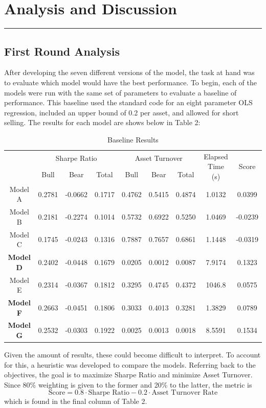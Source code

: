 \documentclass[10pt]{article}
\begin{document}
\section{Analysis and Discussion}
\label{sec:sec4}
\hrule \vspace{15pt}
\subsection{First Round Analysis}
After developing the seven different versions of the model, the task at hand was to evaluate which model would have the best performance. To begin, each of the models were run with the same set of parameters to evaluate a baseline of performance. This baseline used the standard code for an eight parameter OLS regression, included an upper bound of 0.2 per asset, and allowed for short selling. The results for each model are shows below in Table 2:\bigskip

\begin{table}[!htbp]
\footnotesize
\centering
\begin{tabular}{c | c c c | c c c | c | c } 
\hline 
\rule{0pt}{3ex}  \multirow{2}{*}{\textbf{Model}} & \multicolumn{3}{c|}{Sharpe Ratio} & \multicolumn{3}{c|}{Asset Turnover} &   \multirow{2}{*}{Elapsed Time (s)} & \multirow{2}{*}{Score}  \\[1ex]\cline{2-7} 
\rule{0pt}{3ex} &  Bull  &  Bear &  Total & Bull  &  Bear &  Total &  \\[1ex]
\hline 
\rule{0pt}{3ex}Model A        & 
0.2781 &  -0.0662 & 0.1717 & 0.4762 & 0.5415 & 0.4874 & 1.0132 & 0.0399 \\ [1ex]
Model B   & 0.2181    &-0.2274 &0.1014 &0.5732 &0.6922 &0.5250 & 1.0469 &-0.0239   \\ [1ex] 
Model C   & 0.1745 & -0.0243 & 0.1316 &0.7887&0.7657 &0.6861 & 1.1448 & -0.0319        \\ [1ex]
\textbf{Model D}  & 0.2402 & -0.0448 & 0.1679 & 0.0205 & 0.0012 & 0.0087 & 7.9174 & 0.1323       \\ [1ex]
Model E   &  0.2314   & -0.0367  & 0.1812 & 0.3295 & 0.4745 &0.4372 & 1046.8 & 0.0575        \\ [1ex]
\textbf{Model F} & 0.2663 &   -0.0451 & 0.1806 & 0.3033 & 0.4013 & 0.3281 & 1.3829 & 0.0789 \\ [1ex]
\textbf{Model G} & 0.2532 & -0.0303 & 0.1922 & 0.0025 & 0.0013 &0.0018 & 8.5591 &0.1534           \\[1ex]
\hline
\end{tabular}
\caption{Baseline Results}
\label{table:results}
\end{table}
Given the amount of results, these could become difficult to interpret. To account for this,  a heuristic was developed to compare the models. Referring back to the objectives, the goal is to maximize Sharpe Ratio and minimize Asset Turnover. Since 80\% weighting is given to the former and 20\% to the latter, the metric is 
$$ \text{Score} = 0.8 \cdot \text{Sharpe Ratio} - 0.2 \cdot \text{Asset Turnover Rate} $$which is found in the final column of Table 2. \bigskip
\end{document}
